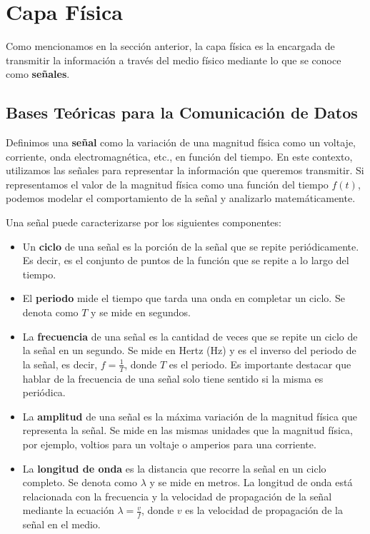 \section{Capa Física}

Como mencionamos en la sección anterior, la capa física es la encargada de transmitir la información a través del medio físico mediante lo que se conoce como \textbf{señales}.

\subsection{Bases Teóricas para la Comunicación de Datos}

\begin{definicion}[Señal]
  Definimos una \textbf{señal} como la variación de una magnitud física como un voltaje, corriente, onda electromagnética, etc., en función del tiempo. En este contexto, utilizamos las señales para representar la información que queremos transmitir. Si representamos el valor de la magnitud física como una función del tiempo $f(t)$, podemos modelar el comportamiento de la señal y analizarlo matemáticamente.
\end{definicion}

\begin{definicion}
  Una señal puede caracterizarse por los siguientes componentes:
  \begin{itemize}
    \item Un \textbf{ciclo} de una señal es la porción de la señal que se repite periódicamente. Es decir, es el conjunto de puntos de la función que se repite a lo largo del tiempo.
    \item El \textbf{periodo} mide el tiempo que tarda una onda en completar un ciclo. Se denota como $T$ y se mide en segundos.
    \item La \textbf{frecuencia} de una señal es la cantidad de veces que se repite un ciclo de la señal en un segundo. Se mide en Hertz (Hz) y es el inverso del periodo de la señal, es decir, $f = \frac{1}{T}$, donde $T$ es el periodo. Es importante destacar que hablar de la frecuencia de una señal solo tiene sentido si la misma es periódica.
    \item La \textbf{amplitud} de una señal es la máxima variación de la magnitud física que representa la señal. Se mide en las mismas unidades que la magnitud física, por ejemplo, voltios para un voltaje o amperios para una corriente.
    \item La \textbf{longitud de onda} es la distancia que recorre la señal en un ciclo completo. Se denota como $\lambda$ y se mide en metros. La longitud de onda está relacionada con la frecuencia y la velocidad de propagación de la señal mediante la ecuación $\lambda = \frac{v}{f}$, donde $v$ es la velocidad de propagación de la señal en el medio.
  \end{itemize}
\end{definicion}


